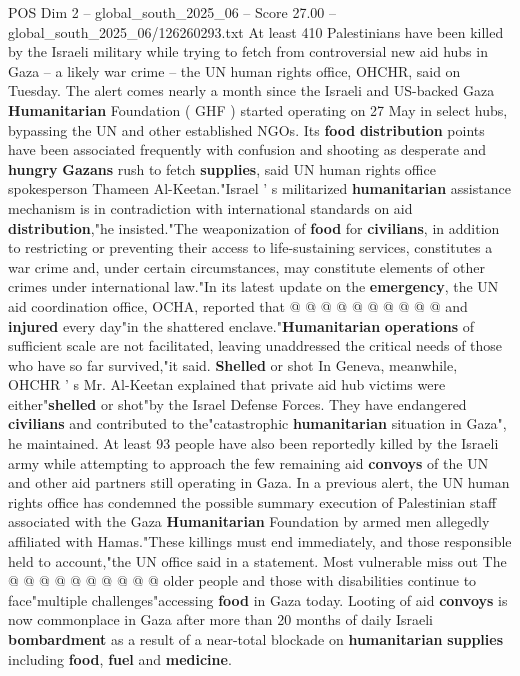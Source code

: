 \begin{textsample}{POS Dim 2 – global\_south\_2025\_06 – Score 27.00 – global\_south\_2025\_06/126260293.txt}  \label{ex:f2_pos_088}
At least 410 Palestinians have been killed by the Israeli military while trying to fetch from controversial new aid hubs in Gaza -- a likely war crime -- the UN human rights office, OHCHR, said on Tuesday.
The alert comes nearly a month since the Israeli and US-backed Gaza \textbf{Humanitarian} Foundation ( GHF ) started operating on 27 May in select hubs, bypassing the UN and other established NGOs.
Its \textbf{food} \textbf{distribution} points have been associated frequently with confusion and shooting as desperate and \textbf{hungry} \textbf{Gazans} rush to fetch \textbf{supplies}, said UN human rights office spokesperson Thameen Al-Keetan."Israel ' s militarized \textbf{humanitarian} assistance mechanism is in contradiction with international standards on aid \textbf{distribution},"he insisted."The weaponization of \textbf{food} for \textbf{civilians}, in addition to restricting or preventing their access to life-sustaining services, constitutes a war crime and, under certain circumstances, may constitute elements of other crimes under international law."In its latest update on the \textbf{emergency}, the UN aid coordination office, OCHA, reported that @ @ @ @ @ @ @ @ @ @ and \textbf{injured} every day"in the shattered enclave."\textbf{Humanitarian} \textbf{operations} of sufficient scale are not facilitated, leaving unaddressed the critical needs of those who have so far survived,"it said. \textbf{Shelled} or shot In Geneva, meanwhile, OHCHR ' s Mr.
Al-Keetan explained that private aid hub victims were either"\textbf{shelled} or shot"by the Israel Defense Forces.
They have endangered \textbf{civilians} and contributed to the"catastrophic \textbf{humanitarian} situation in Gaza", he maintained.
At least 93 people have also been reportedly killed by the Israeli army while attempting to approach the few remaining aid \textbf{convoys} of the UN and other aid partners still operating in Gaza.
In a previous alert, the UN human rights office has condemned the possible summary execution of Palestinian staff associated with the Gaza \textbf{Humanitarian} Foundation by armed men allegedly affiliated with Hamas."These killings must end immediately, and those responsible held to account,"the UN office said in a statement.
Most vulnerable miss out The @ @ @ @ @ @ @ @ @ @ older people and those with disabilities continue to face"multiple challenges"accessing \textbf{food} in Gaza today.
Looting of aid \textbf{convoys} is now commonplace in Gaza after more than 20 months of daily Israeli \textbf{bombardment} as a result of a near-total blockade on \textbf{humanitarian} \textbf{supplies} including \textbf{food}, \textbf{fuel} and \textbf{medicine}.

\end{textsample}
